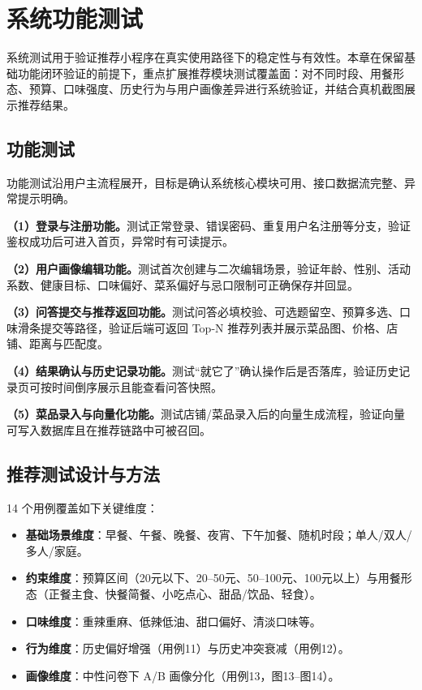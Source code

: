 \chapter{系统功能测试}

系统测试用于验证推荐小程序在真实使用路径下的稳定性与有效性。本章在保留基础功能闭环验证的前提下，重点扩展推荐模块测试覆盖面：对不同时段、用餐形态、预算、口味强度、历史行为与用户画像差异进行系统验证，并结合真机截图展示推荐结果。

\section{功能测试}

功能测试沿用户主流程展开，目标是确认系统核心模块可用、接口数据流完整、异常提示明确。

\textbf{（1）登录与注册功能。}测试正常登录、错误密码、重复用户名注册等分支，验证鉴权成功后可进入首页，异常时有可读提示。

\textbf{（2）用户画像编辑功能。}测试首次创建与二次编辑场景，验证年龄、性别、活动系数、健康目标、口味偏好、菜系偏好与忌口限制可正确保存并回显。

\textbf{（3）问答提交与推荐返回功能。}测试问答必填校验、可选题留空、预算多选、口味滑条提交等路径，验证后端可返回 Top-N 推荐列表并展示菜品图、价格、店铺、距离与匹配度。

\textbf{（4）结果确认与历史记录功能。}测试“就它了”确认操作后是否落库，验证历史记录页可按时间倒序展示且能查看问答快照。

\textbf{（5）菜品录入与向量化功能。}测试店铺/菜品录入后的向量生成流程，验证向量可写入数据库且在推荐链路中可被召回。

\section{推荐测试设计与方法}

14 个用例覆盖如下关键维度：

\begin{itemize}[leftmargin=2em, itemsep=0.2em]
\item \textbf{基础场景维度}：早餐、午餐、晚餐、夜宵、下午加餐、随机时段；单人/双人/多人/家庭。
\item \textbf{约束维度}：预算区间（20元以下、20--50元、50--100元、100元以上）与用餐形态（正餐主食、快餐简餐、小吃点心、甜品/饮品、轻食）。
\item \textbf{口味维度}：重辣重麻、低辣低油、甜口偏好、清淡口味等。
\item \textbf{行为维度}：历史偏好增强（用例11）与历史冲突衰减（用例12）。
\item \textbf{画像维度}：中性问卷下 A/B 画像分化（用例13，图13--图14）。
\end{itemize}


